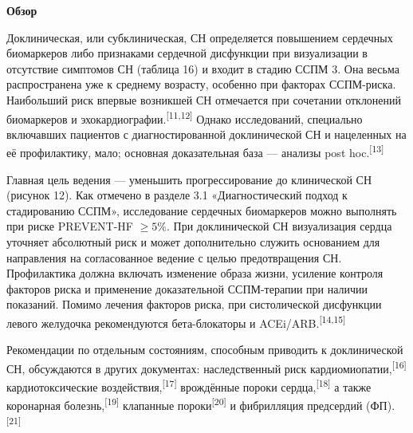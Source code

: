 \documentclass[11pt,a4paper]{article}
\newcommand{\src}[1]{\textsuperscript{[#1]}}
\newcommand{\heading}[1]{\par\medskip\textbf{#1}\par}
\begin{document}
\heading{Обзор}
Доклиническая, или субклиническая, СН определяется повышением сердечных биомаркеров либо признаками сердечной дисфункции при визуализации в отсутствие симптомов СН (таблица 16) и входит в стадию ССПМ 3. Она весьма распространена уже к среднему возрасту, особенно при факторах ССПМ-риска. Наибольший риск впервые возникшей СН отмечается при сочетании отклонений биомаркеров и эхокардиографии.\src{11,12} Однако исследований, специально включавших пациентов с диагностированной доклинической СН и нацеленных на её профилактику, мало; основная доказательная база --- анализы post hoc.\src{13}

Главная цель ведения --- уменьшить прогрессирование до клинической СН (рисунок 12). Как отмечено в разделе 3.1 «Диагностический подход к стадированию ССПМ», исследование сердечных биомаркеров можно выполнять при риске PREVENT-HF $\geq5\%$. При доклинической СН визуализация сердца уточняет абсолютный риск и может дополнительно служить основанием для направления на согласованное ведение с целью предотвращения СН. Профилактика должна включать изменение образа жизни, усиление контроля факторов риска и применение доказательной ССПМ-терапии при наличии показаний. Помимо лечения факторов риска, при систолической дисфункции левого желудочка рекомендуются бета-блокаторы и ACEi/ARB.\src{14,15}

Рекомендации по отдельным состояниям, способным приводить к доклинической СН, обсуждаются в других документах: наследственный риск кардиомиопатии,\src{16} кардиотоксические воздействия,\src{17} врождённые пороки сердца,\src{18} а также коронарная болезнь,\src{19} клапанные пороки\src{20} и фибрилляция предсердий (ФП).\src{21}
\end{document}

